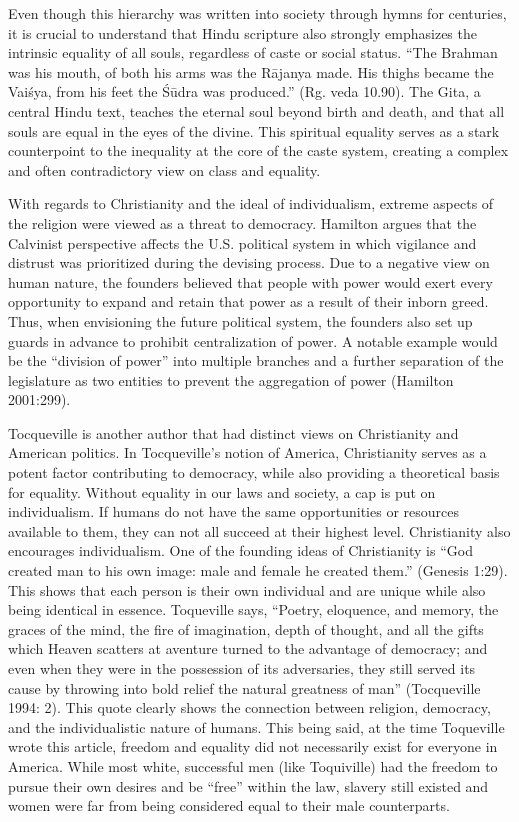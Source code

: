 \documentclass[
	letterpaper, %
	10pt, %
	unnumberedsections, %
	twoside, %
]{LTJournalArticle}
\begin{document}
Even though this hierarchy was written into society through hymns for centuries, it is crucial to understand that Hindu scripture also strongly emphasizes the intrinsic equality of all souls, regardless of caste or social status. “The Brahman was his mouth, of both his arms was the Rājanya made. His thighs became the Vaiśya, from his feet the Śūdra was produced.” (Rg. veda 10.90). The Gita, a central Hindu text, teaches the eternal soul beyond birth and death, and that all souls are equal in the eyes of the divine. This spiritual equality serves as a stark counterpoint to the inequality at the core of the caste system, creating a complex and often contradictory view on class and equality.

With regards to Christianity and the ideal of individualism, extreme aspects of the religion were viewed as a threat to democracy. Hamilton argues that the Calvinist perspective affects the U.S. political system in which vigilance and distrust was prioritized during the devising process. Due to a negative view on human nature, the founders believed that people with power would exert every opportunity to expand and retain that power as a result of their inborn greed. Thus, when envisioning the future political system, the founders also set up guards in advance to prohibit centralization of power. A notable example would be the “division of power” into multiple branches and a further separation of the legislature as two entities to prevent the aggregation of power (Hamilton 2001:299).

Tocqueville is another author that had distinct views on Christianity and American politics. In Tocqueville’s notion of America, Christianity serves as a potent factor contributing to democracy, while also providing a theoretical basis for equality. Without equality in our laws and society, a cap is put on individualism. If humans do not have the same opportunities or resources available to them, they can not all succeed at their highest level. Christianity also encourages individualism. One of the founding ideas of Christianity is “God created man to his own image:  male and female he created them.” (Genesis 1:29). This shows that each person is their own individual and are unique while also being identical in essence. Toqueville says, “Poetry, eloquence, and memory, the graces of the mind, the fire of imagination, depth of thought, and all the gifts which Heaven scatters at aventure turned to the advantage of democracy; and even when they were in the possession of its adversaries, they still served its cause by throwing into bold relief the natural greatness of man” (Tocqueville 1994: 2). This quote clearly shows the connection between religion, democracy, and the individualistic nature of humans. This being said, at the time Toqueville wrote this article, freedom and equality did not necessarily exist for everyone in America. While most white, successful men (like Toquiville) had the freedom to pursue their own desires and be “free” within the law, slavery still existed and women were far from being considered equal to their male counterparts. 
\end{document}
